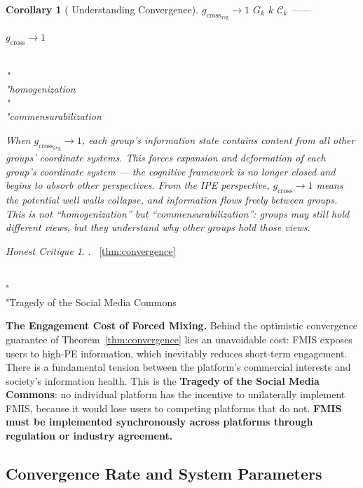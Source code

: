 \documentclass[11pt,a4paper]{article}
\newtheorem{corollary}[theorem]{Corollary}
\theoremstyle{remark}
\newtheorem{honestattack}{Honest Critique}
\newenvironment{attackbox}{%
  \begin{center}
  \color{red}
  \begin{minipage}{0.92\textwidth}
  \begin{honestattack}
}{%
  \end{honestattack}
  \end{minipage}
  \end{center}
}
\newcommand{\GCoupling}{g_{\text{cross}}}
\newcommand{\CoordSys}{\mathcal{C}}
\begin{document}
\begin{corollary}[ Understanding Convergence]
\label{cor:understanding}
 $\GCoupling_{\text{avg}} \to 1$  $G_k$ 
 $k$  $\CoordSys_k$ ——

$\GCoupling \to 1$ 

\\"\\"homogenization\\"\\"commensurabilization


When $\GCoupling_{\text{avg}} \to 1$, each group's information state contains content
from all other groups' coordinate systems. This forces expansion and deformation of each
group's coordinate system --- the cognitive framework is no longer closed and begins to
absorb other perspectives. From the IPE perspective, $\GCoupling \to 1$ means the
potential well walls collapse, and information flows freely between groups. This is not
``homogenization'' but ``commensurabilization'': groups may still hold different views,
but they understand why other groups hold those views.
\end{corollary}

\begin{attackbox}
  \textbf{}.
  ~\ref{thm:convergence} 
  
  
  \\"\\"Tragedy of the Social Media Commons
  
  
  \textbf{}

  \textbf{The Engagement Cost of Forced Mixing.}
  Behind the optimistic convergence guarantee of Theorem~\ref{thm:convergence} lies an
  unavoidable cost: FMIS exposes users to high-PE information, which inevitably reduces
  short-term engagement. There is a fundamental tension between the platform's commercial
  interests and society's information health. This is the \textbf{Tragedy of the Social
  Media Commons}: no individual platform has the incentive to unilaterally implement FMIS,
  because it would lose users to competing platforms that do not.
  \textbf{FMIS must be implemented synchronously across platforms through regulation or
  industry agreement.}
\end{attackbox}

\subsection{}

\subsection{Convergence Rate and System Parameters}
\end{document}
